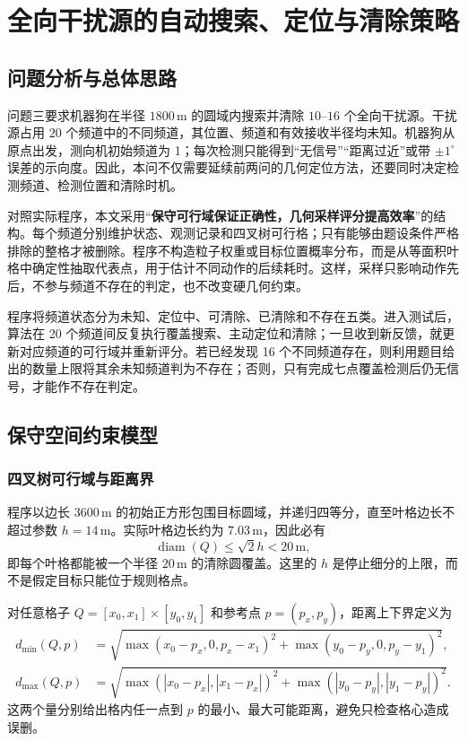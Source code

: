\section{全向干扰源的自动搜索、定位与清除策略}

\subsection{问题分析与总体思路}

问题三要求机器狗在半径 $1800\,\mathrm m$ 的圆域内搜索并清除 $10$--$16$ 个全向干扰源。干扰源占用 $20$ 个频道中的不同频道，其位置、频道和有效接收半径均未知。机器狗从原点出发，测向机初始频道为 1；每次检测只能得到“无信号”“距离过近”或带 $\pm1^\circ$ 误差的示向度。因此，本问不仅需要延续前两问的几何定位方法，还要同时决定检测频道、检测位置和清除时机。

对照实际程序，本文采用“\textbf{保守可行域保证正确性，几何采样评分提高效率}”的结构。每个频道分别维护状态、观测记录和四叉树可行格；只有能够由题设条件严格排除的整格才被删除。程序不构造粒子权重或目标位置概率分布，而是从等面积叶格中确定性抽取代表点，用于估计不同动作的后续耗时。这样，采样只影响动作先后，不参与频道不存在的判定，也不改变硬几何约束。

程序将频道状态分为未知、定位中、可清除、已清除和不存在五类。进入测试后，算法在 20 个频道间反复执行覆盖搜索、主动定位和清除；一旦收到新反馈，就更新对应频道的可行域并重新评分。若已经发现 16 个不同频道存在，则利用题目给出的数量上限将其余未知频道判为不存在；否则，只有完成七点覆盖检测后仍无信号，才能作不存在判定。

\subsection{保守空间约束模型}

\subsubsection{四叉树可行域与距离界}

程序以边长 $3600\,\mathrm m$ 的初始正方形包围目标圆域，并递归四等分，直至叶格边长不超过参数 $h=14\,\mathrm m$。实际叶格边长约为 $7.03\,\mathrm m$，因此必有
\[
\operatorname{diam}(Q)\leq \sqrt 2h<20\,\mathrm m,
\]
即每个叶格都能被一个半径 $20\,\mathrm m$ 的清除圆覆盖。这里的 $h$ 是停止细分的上限，而不是假定目标只能位于规则格点。

对任意格子 $Q=[x_0,x_1]\times[y_0,y_1]$ 和参考点 $p=(p_x,p_y)$，距离上下界定义为
\begin{align}
d_{\min}(Q,p)
&=\sqrt{\max(x_0-p_x,0,p_x-x_1)^2+\max(y_0-p_y,0,p_y-y_1)^2},\label{eq:q3-dmin}\\
d_{\max}(Q,p)
&=\sqrt{\max(|x_0-p_x|,|x_1-p_x|)^2+\max(|y_0-p_y|,|y_1-p_y|)^2}.\label{eq:q3-dmax}
\end{align}
这两个量分别给出格内任一点到 $p$ 的最小、最大可能距离，避免只检查格心造成误删。

